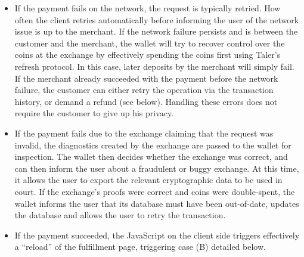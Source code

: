 \documentclass{llncs}
\begin{document}
\begin{itemize}
\item If the payment fails on the network, the request is typically
 retried.  How often the client retries automatically before informing
 the user of the network issue is up to the merchant.  If the network
 failure persists and is between the customer and the merchant, the wallet
 will try to recover control over the coins at the exchange by
 effectively spending the coins first using Taler's
 refresh protocol.  In this case, later deposits by the merchant
 will simply fail.  If the merchant already succeeded with the payment
 before the network failure, the customer can either retry the
 operation via the transaction history, or demand a refund (see
 below).  Handling these errors does not require the customer to give
 up his privacy.
\item If the payment fails due to the exchange
 claiming that the request was invalid, the diagnostics created by the
 exchange are passed to the wallet for inspection.  The wallet then
 decides whether the exchange was correct, and can then inform the
 user about a fraudulent or buggy exchange.  At this time, it allows
 the user to export the relevant cryptographic data to be used in
 court.  If the exchange's proofs were correct and coins were
 double-spent, the wallet informs the user that its database must have
 been out-of-date, updates the database and allows the user to retry
 the transaction.
\item If the payment succeeded, the JavaScript on the
 client side triggers effectively a ``reload'' of the fulfillment
 page, triggering case (B) detailed below.
\end{itemize}
\end{document}
